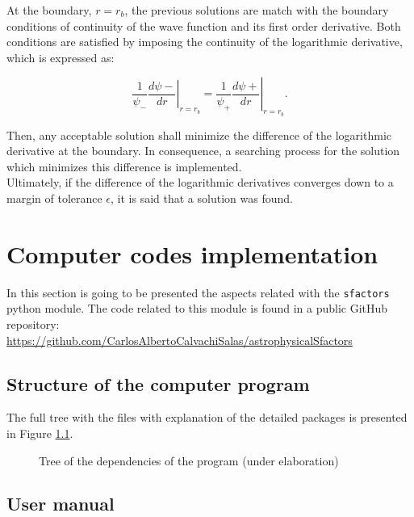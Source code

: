 \documentclass[openany]{book}
\begin{document}
At the boundary, $r = r_b$, the previous solutions are match with the boundary conditions of continuity of the wave function and its first order derivative. Both conditions are satisfied by imposing the continuity of the logarithmic derivative, which is expressed as: 

\begin{equation}\label{eq:numericalIntegration_boundaryCondition}
	\left.\frac{1}{\psi_{-} } \frac{d\psi{-}}{dr}\right|_{r = r_b} = \left.\frac{1}{\psi_{+} } \frac{d\psi{+}}{dr}\right|_{r = r_b}. 
\end{equation}

Then, any acceptable solution shall minimize the difference of the logarithmic derivative at the boundary. In consequence, a searching process for the solution which minimizes this difference is implemented. \\

Ultimately, if the difference of the logarithmic derivatives converges down to a margin of tolerance $\epsilon$, it is said that a solution was found. 

\chapter{Computer codes implementation} \label{ap:codes}

In this section is going to be presented the aspects related with the \texttt{sfactors} python module. The code related to this module is found in a public GitHub repository:  \\

\href{https://github.com/CarlosAlbertoCalvachiSalas/astrophysicalSfactors}{https://github.com/CarlosAlbertoCalvachiSalas/astrophysicalSfactors}

\section{Structure of the computer program} \label{sec:programStructure}

The full tree with the files with explanation of the detailed packages is presented in Figure \ref{fig:programTree}.

\begin{figure}[H]
	
	\caption[Tree of the dependencies of the program]{Tree of the dependencies of the program (under elaboration)}
	\label{fig:programTree}
\end{figure}

\section{User manual} \label{sec:userManual}
\end{document}
